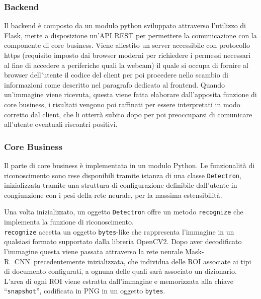 \documentclass[12pt,a4paper]{article}
\newcommand{\mrcnn}{Mask-R\_CNN}
\begin{document}
\subsubsection{Backend}

Il backend è composto da un modulo python sviluppato attraverso l'utilizzo di Flask,
mette a disposizione un'API REST per permettere la
comunicazione con la componente di core business. Viene
allestito un server accessibile con protocollo https (requisito imposto dai
browser moderni per richiedere i permessi necessari al fine di accedere
a periferiche quali la webcam) il quale si occupa di fornire al browser
dell'utente il codice del client per poi procedere nello scambio di
informazioni come descritto nel paragrafo dedicato al frontend. Quando
un'immagine viene ricevuta, questa viene fatta elaborare dall'apposita
funzione di core business, i risultati vengono poi raffinati per essere
interpretati in modo corretto dal client, che li otterrà subito dopo
per poi preoccuparsi di comunicare all'utente eventuali riscontri positivi.

\subsubsection{Core Business}

Il parte di core business è implementata in un modulo Python. Le
funzionalità di riconoscimento sono rese disponibili tramite istanza di
una classe \texttt{Detectron}, inizializzata tramite una struttura di
configurazione definibile dall'utente in congiunzione con i pesi della
rete neurale, per la massima estensibilità.

Una volta inizializzato, un oggetto \texttt{Detectron} offre un metodo
\texttt{recognize} che implementa la funzione di riconoscimento.\\
\texttt{recognize} accetta un oggetto \texttt{bytes}-like che
rappresenta l'immagine in un qualsiasi formato supportato dalla libreria
OpenCV2. Dopo aver decodificato l'immagine questa viene passata
attraverso la rete neurale \mrcnn\ precedentemente inizializzata, che
individua delle ROI associate ai tipi di documento configurati, a ognuna
delle quali sarà associato un dizionario. L'area di ogni ROI viene
estratta dall'immagine e memorizzata alla chiave ``\texttt{snapshot}'',
codificata in PNG in un oggetto \texttt{bytes}.
\end{document}
